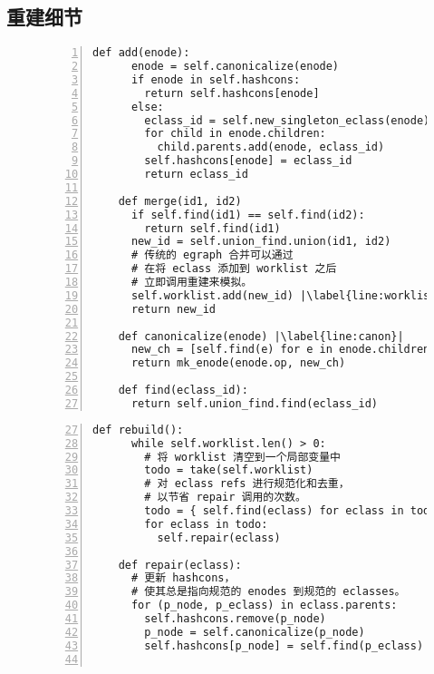 \subsection{重建细节}
\label{sec:rebuilding-detail}


\begin{figure}
  \begin{minipage}[t]{0.47\linewidth}
    \begin{lstlisting}[gobble=4, numbers=left, basicstyle=\scriptsize\ttfamily, escapechar=|]
    def add(enode):
      enode = self.canonicalize(enode)
      if enode in self.hashcons:
        return self.hashcons[enode]
      else:
        eclass_id = self.new_singleton_eclass(enode)
        for child in enode.children:
          child.parents.add(enode, eclass_id)
        self.hashcons[enode] = eclass_id
        return eclass_id

    def merge(id1, id2)
      if self.find(id1) == self.find(id2):
        return self.find(id1)
      new_id = self.union_find.union(id1, id2)
      # 传统的 egraph 合并可以通过
      # 在将 eclass 添加到 worklist 之后
      # 立即调用重建来模拟。
      self.worklist.add(new_id) |\label{line:worklist-add}|
      return new_id

    def canonicalize(enode) |\label{line:canon}|
      new_ch = [self.find(e) for e in enode.children]
      return mk_enode(enode.op, new_ch)

    def find(eclass_id):
      return self.union_find.find(eclass_id)
    \end{lstlisting}
  \end{minipage}
  \hfill
  \begin{minipage}[t]{0.47\linewidth}
    \begin{lstlisting}[gobble=4, numbers=left, firstnumber=27, basicstyle=\scriptsize\ttfamily]
    def rebuild():
      while self.worklist.len() > 0:
        # 将 worklist 清空到一个局部变量中
        todo = take(self.worklist)
        # 对 eclass refs 进行规范化和去重，
        # 以节省 repair 调用的次数。
        todo = { self.find(eclass) for eclass in todo }
        for eclass in todo:
          self.repair(eclass)

    def repair(eclass):
      # 更新 hashcons，
      # 使其总是指向规范的 enodes 到规范的 eclasses。
      for (p_node, p_eclass) in eclass.parents:
        self.hashcons.remove(p_node)
        p_node = self.canonicalize(p_node)
        self.hashcons[p_node] = self.find(p_eclass)


\end{lstlisting}
\end{minipage}
\end{figure}
